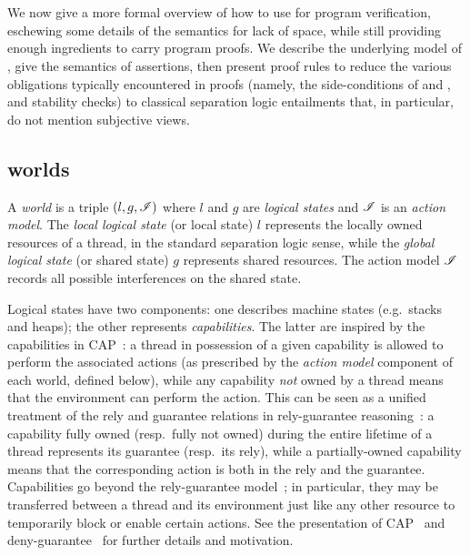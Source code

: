 \section{\colosl}\label{sec:colosl}
We now give a more formal overview of how to use \colosl for program
verification, eschewing some details of the semantics for lack of
space, while still providing enough ingredients to carry program
proofs. We describe the underlying model of \colosl, give the
semantics of \colosl assertions, then present proof rules to reduce
the various obligations typically encountered in proofs (namely, the
side-conditions of \shiftRule and \extendRule, and stability checks)
to classical separation logic entailments that, in
particular, do not mention subjective views.


\subsection{\colosl worlds}
\label{subsec:model}

A \emph{world} is a triple $(l, g, \mathscr{I})$ where $l$ and $g$ are
\emph{logical states} and $\mathscr{I}$ is an \emph{action model}. The
\emph{local logical state} (or local state) $l$ represents the
locally owned resources of a thread, in the standard separation logic
sense, while the \emph{global logical state} (or shared state)
$g$ represents shared resources. The action model $\mathscr{I}$ records all possible interferences on the shared state.

Logical states have two components: one describes machine states
(e.g.\ stacks and heaps); the other represents
\emph{capabilities}. The latter are inspired by the capabilities in
CAP~\cite{cap-ecoop10}: a thread in possession of a given
capability is allowed to perform the associated actions (as prescribed
by the \emph{action model} component of each world, defined below),
while any capability \emph{not} owned by a thread means that the
environment can perform the action. This can be seen as a unified
treatment of the rely and guarantee relations in rely-guarantee
reasoning~\cite{rg}: a capability fully owned (resp.\ fully not owned)
during the entire lifetime of a thread represents its guarantee
(resp.\ its rely), while a partially-owned capability means that the
corresponding action is both in the rely and the
guarantee. Capabilities go beyond the rely-guarantee model~\cite{dg};
in particular, they may be transferred between a thread and its
environment just like any other resource to temporarily block or enable certain actions. See the presentation of
CAP~\cite{cap-ecoop10} and deny-guarantee~\cite{dg} for further details
and motivation.

